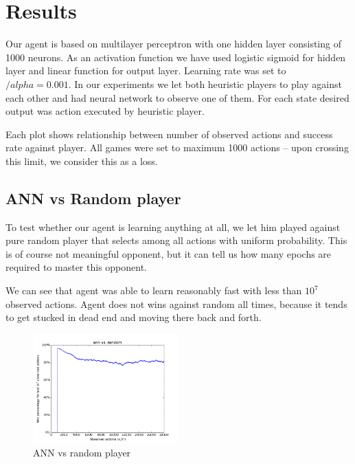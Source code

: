 \chapter{Results}\label{chap:5}
Our agent is based on multilayer perceptron with one hidden layer consisting of 1000 neurons.
As an activation function we have used logistic sigmoid for hidden layer and linear function
for output layer. Learning rate was set to \(/alpha=0.001\). In our experiments we let both
heuristic players to play against each other and had neural network to observe one of them.
For each state desired output was action executed by heuristic player.

Each plot shows relationship between number of observed actions and success rate against player.
All games were set to maximum 1000 actions -- upon crossing this limit, we consider this as a loss.

\section{ANN vs Random player}

To test whether our agent is learning anything at all, we let him played against pure random
player that selects among all actions with uniform probability. This is of course not meaningful
opponent, but it can tell us how many epochs are required to master this opponent.

We can see that agent was able to learn reasonably fast with less than \(10^7\) observed actions.
Agent does not wins against random all times, because it tends to get stucked in dead end and moving
there back and forth.

\begin{figure}[h!]
  \centering
    \graphicspath{{pictures/}}
  \includegraphics[width=0.50\textwidth]{eps_vs_random.png}
  \vspace*{-0.20cm}
  \caption{ANN vs random player}
  \label{fig:p1}
  \vspace*{-0.00cm}
\end{figure}
\newpage


